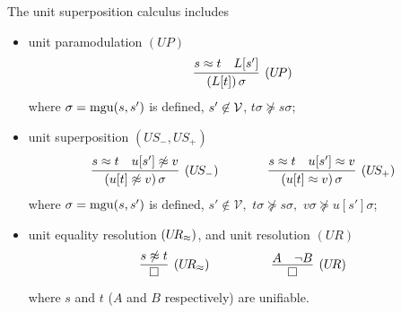 \begin{definition}\label{def:unit-superpositin-calculus}
The {\EMPH unit superposition calculus} includes 
\begin{itemize}
\item unit paramodulation $(U\!P)$
\begin{gather*}
	\infer
	[(U\!P)]
	{(L[t])\,\sigma}
	{s\foEQ t&L[s']}
\end{gather*}
where $\sigma=\operatorname{mgu}(s,s')$ is defined,
$s'\not\in{\mathcal V}$,
$t\sigma\not\succcurlyeq s\sigma$;
%
\item unit superposition $(U\!S_-,U\!S_+)$
\begin{gather*}
	\infer
	[(U\!S_-)]
	{(u[t]\foNEQ v)\,\sigma}
	{s\foEQ t&u[s']\foNEQ v}
	\qquad\qquad
	\infer
	[(U\!S_+)]
	{(u[t]\foEQ v)\,\sigma}
	{s\foEQ t&u[s']\foEQ v}
\end{gather*}
where $\sigma=\operatorname{mgu}(s,s')$ is defined,
$s'\not\in\mathcal{V},$
$t\sigma\not\succcurlyeq s\sigma,$
$v\sigma\not\succcurlyeq u[s']\sigma$;
%
\item unit equality resolution $(U\!R_\approx)$, and unit resolution $(U\!R)$
\begin{gather*}
	\infer
	[(U\!R_\foEQ)]
	{\emptyclause}
	{s\foNEQ t}
	\quad\quad\quad\qquad
	\infer
	[(U\!R)]
	{\emptyclause}
	{A&\lnot B}
\end{gather*}
where $s$ and $t$ ($A$ and $B$ respectively) are unifiable.
\end{itemize}
\end{definition}